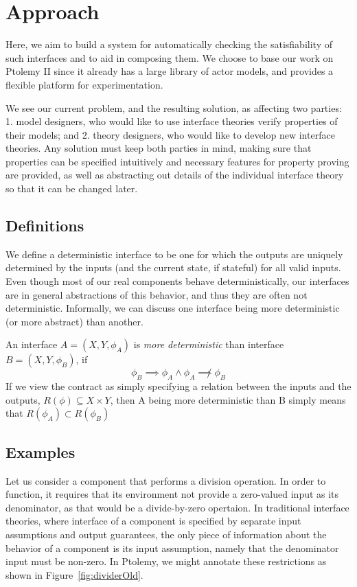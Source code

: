 \documentclass[preprint,11pt]{sigplanconf}
\begin{document}
\section{Approach} %
Here, we aim to build a system for automatically checking the satisfiability
of such interfaces and to aid in composing them. We choose to base our work on
Ptolemy II since it already has a large library of actor models, and provides a
flexible platform for experimentation.

We see our current problem, and the resulting solution, as affecting two
parties:
1. model designers, who would like to use interface theories verify properties
of their models; and
2. theory designers, who would like to develop new interface theories.
%
Any solution must keep both parties in mind, making sure that properties
can be specified intuitively and necessary features for property proving are
provided, as well as abstracting out details of the individual interface theory
so that it can be changed later.

\subsection{Definitions}
We define a deterministic interface to be one for which the outputs are
uniquely determined by the inputs (and the current state, if stateful) for all
valid inputs.
Even though most of our real components behave deterministically, our
interfaces are in general abstractions of this behavior, and thus they are
often not deterministic.
Informally, we can discuss one interface being more deterministic (or more
abstract) than another.

An interface $A=(X,Y,\phi_A)$ is \emph{more deterministic} than interface
$B=(X,Y,\phi_B)$, if
\[
\phi_B \implies \phi_A \wedge \phi_A \not\implies \phi_B
\]
If we view the contract as simply specifying a relation between the inputs and
the outputs, $R(\phi) \subseteq X \times Y$, then A being more deterministic
than B simply means that $R(\phi_A) \subset R(\phi_B)$


\subsection{Examples}
Let us consider a component that performs a division operation.  In order to
function, it requires that its environment not provide a zero-valued input as
its denominator, as that would be a divide-by-zero opertaion. In traditional
interface theories, where interface of a component is specified by separate
input assumptions and output guarantees, the only piece of information about
the behavior of a component is its input assumption, namely that the
denominator input must be non-zero. In Ptolemy, we might annotate these
restrictions as shown in Figure~\ref{fig:dividerOld}.
\end{document}
